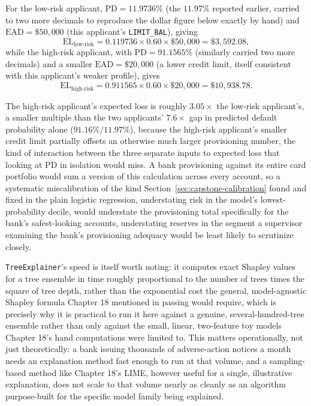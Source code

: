 \documentclass[../ai_in_finance]{subfiles}
\begin{document}
For the low-risk applicant, $\text{PD}=11.9736\%$ (the $11.97\%$ reported earlier, carried to two more decimals to reproduce the dollar figure below exactly by hand) and $\text{EAD}=\$50{,}000$ (this applicant's \texttt{LIMIT\_BAL}), giving
\begin{equation*}
\text{EL}_{\text{low-risk}} = 0.119736 \times 0.60 \times \$50{,}000 = \$3{,}592.08,
\end{equation*}
while the high-risk applicant, with $\text{PD}=91.1565\%$ (similarly carried two more decimals) and a smaller $\text{EAD}=\$20{,}000$ (a lower credit limit, itself consistent with this applicant's weaker profile), gives
\begin{equation*}
\text{EL}_{\text{high-risk}} = 0.911565 \times 0.60 \times \$20{,}000 = \$10{,}938.78.
\end{equation*}

The high-risk applicant's expected loss is roughly $3.05\times$ the low-risk applicant's, a smaller multiple than the two applicants' $7.6\times$ gap in predicted default probability alone ($91.16\%/11.97\%$), because the high-risk applicant's smaller credit limit partially offsets an otherwise much larger provisioning number, the kind of interaction between the three separate inputs to expected loss that looking at PD in isolation would miss. A bank provisioning against its entire card portfolio would sum a version of this calculation across every account, so a systematic miscalibration of the kind Section~\ref{sec:capstone-calibration} found and fixed in the plain logistic regression, understating risk in the model's lowest-probability decile, would understate the provisioning total specifically for the bank's safest-looking accounts, understating reserves in the segment a supervisor examining the bank's provisioning adequacy would be least likely to scrutinize closely.

\texttt{TreeExplainer}'s speed is itself worth noting: it computes exact Shapley values for a tree ensemble in time roughly proportional to the number of trees times the square of tree depth, rather than the exponential cost the general, model-agnostic Shapley formula Chapter 18 mentioned in passing would require, which is precisely why it is practical to run it here against a genuine, several-hundred-tree ensemble rather than only against the small, linear, two-feature toy models Chapter 18's hand computations were limited to. This matters operationally, not just theoretically: a bank issuing thousands of adverse-action notices a month needs an explanation method fast enough to run at that volume, and a sampling-based method like Chapter 18's LIME, however useful for a single, illustrative explanation, does not scale to that volume nearly as cleanly as an algorithm purpose-built for the specific model family being explained.
\end{document}

